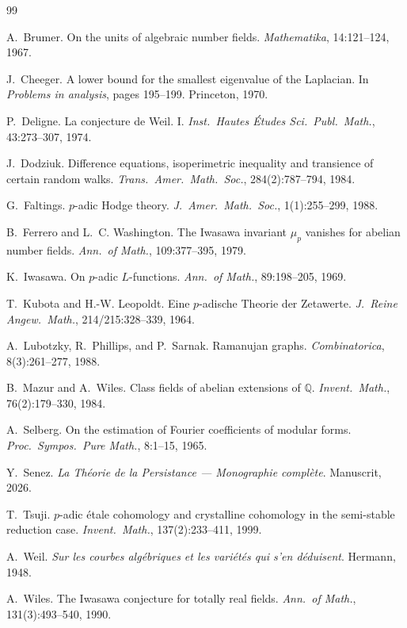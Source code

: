 \documentclass[11pt,a4paper]{article}
\theoremstyle{definition}
\newcommand{\Q}{\mathbb{Q}}
\begin{document}
\begin{thebibliography}{99}

A.~Brumer.
On the units of algebraic number fields.
\emph{Mathematika}, 14:121--124, 1967.

J.~Cheeger.
A lower bound for the smallest eigenvalue of the Laplacian.
In \emph{Problems in analysis}, pages 195--199. Princeton, 1970.

P.~Deligne.
La conjecture de Weil. I.
\emph{Inst.\ Hautes Études Sci.\ Publ.\ Math.}, 43:273--307, 1974.

J.~Dodziuk.
Difference equations, isoperimetric inequality and transience of
certain random walks.
\emph{Trans.\ Amer.\ Math.\ Soc.}, 284(2):787--794, 1984.

G.~Faltings.
$p$-adic Hodge theory.
\emph{J.\ Amer.\ Math.\ Soc.}, 1(1):255--299, 1988.

B.~Ferrero and L.~C. Washington.
The Iwasawa invariant $\mu_p$ vanishes for abelian number fields.
\emph{Ann.\ of Math.}, 109:377--395, 1979.

K.~Iwasawa.
On $p$-adic $L$-functions.
\emph{Ann.\ of Math.}, 89:198--205, 1969.

T.~Kubota and H.-W. Leopoldt.
Eine $p$-adische Theorie der Zetawerte.
\emph{J.\ Reine Angew.\ Math.}, 214/215:328--339, 1964.

A.~Lubotzky, R.~Phillips, and P.~Sarnak.
Ramanujan graphs.
\emph{Combinatorica}, 8(3):261--277, 1988.

B.~Mazur and A.~Wiles.
Class fields of abelian extensions of $\Q$.
\emph{Invent.\ Math.}, 76(2):179--330, 1984.

A.~Selberg.
On the estimation of Fourier coefficients of modular forms.
\emph{Proc.\ Sympos.\ Pure Math.}, 8:1--15, 1965.

Y.~Senez.
\emph{La Théorie de la Persistance — Monographie complète}.
Manuscrit, 2026.

T.~Tsuji.
$p$-adic étale cohomology and crystalline cohomology in the
semi-stable reduction case.
\emph{Invent.\ Math.}, 137(2):233--411, 1999.

A.~Weil.
\emph{Sur les courbes algébriques et les variétés qui s'en déduisent}.
Hermann, 1948.

A.~Wiles.
The Iwasawa conjecture for totally real fields.
\emph{Ann.\ of Math.}, 131(3):493--540, 1990.

\end{thebibliography}
\end{document}
